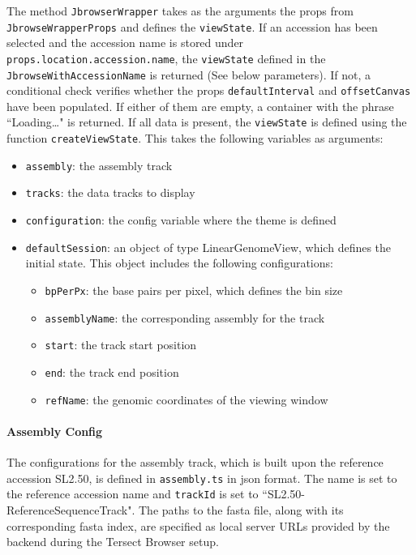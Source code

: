 \documentclass[12pt]{article}
\begin{document}
The method \verb +JbrowserWrapper+ takes as the arguments the props from \verb +JbrowseWrapperProps+ and defines the \verb +viewState+. If an accession has been selected and the accession name is stored under \verb +props.location.accession.name+, the \verb +viewState+ defined in the \verb +JbrowseWithAccessionName+ is returned (See below parameters). If not, a conditional check verifies whether the props \verb +defaultInterval+ and \verb +offsetCanvas+ have been populated. If either of them are empty, a container with the phrase ``Loading…" is returned. If all data is present, the \verb +viewState+ is defined using the function \verb +createViewState+. This takes the following variables as arguments: 
\begin{itemize}
\item \verb +assembly+: the assembly track 
\item \verb +tracks+: the data tracks to display 
\item \verb +configuration+: the config variable where the theme is defined 
\item \verb +defaultSession+: an object of type LinearGenomeView, which defines the initial state. This object includes the following configurations: 
\begin{itemize}
\item \verb +bpPerPx+: the base pairs per pixel, which defines the bin size 
\item \verb +assemblyName+: the corresponding assembly for the track 
\item \verb +start+: the track start position 
\item \verb +end+: the track end position 
\item \verb +refName+: the genomic coordinates of the viewing window 
\end{itemize}
\end{itemize}

\paragraph{Assembly Config}

The configurations for the assembly track, which is built upon the reference accession SL2.50, is defined in \verb +assembly.ts+ in json format. The name is set to the reference accession name and \verb +trackId+ is set to ``SL2.50-ReferenceSequenceTrack". The paths to the fasta file, along with its corresponding fasta index, are specified as local server URLs provided by the backend during the Tersect Browser setup. 
\end{document}

